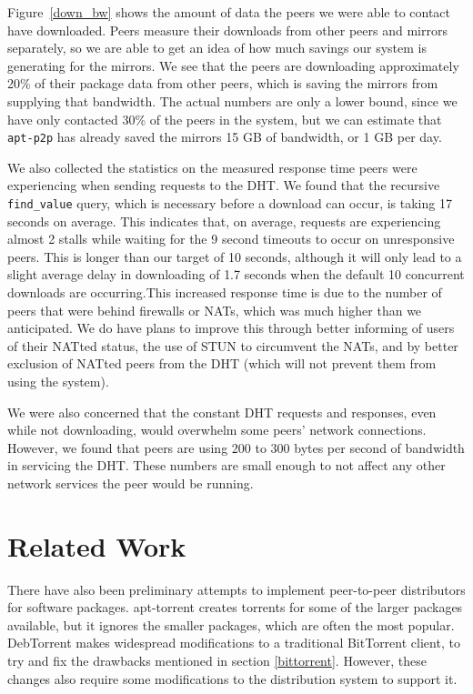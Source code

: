 \documentclass[conference]{IEEEtran}
\begin{document}
Figure~\ref{down_bw} shows the amount of data the peers we were able
to contact have downloaded. Peers measure their downloads from other
peers and mirrors separately, so we are able to get an idea of how
much savings our system is generating for the mirrors. We see that
the peers are downloading approximately 20\% of their package data
from other peers, which is saving the mirrors from supplying that
bandwidth. The actual numbers are only a lower bound, since we have
only contacted 30\% of the peers in the system, but we can estimate
that \texttt{apt-p2p} has already saved the mirrors 15 GB of
bandwidth, or 1 GB per day.

We also collected the statistics on the measured response time peers
were experiencing when sending requests to the DHT. We found that
the recursive \texttt{find\_value} query, which is necessary before
a download can occur, is taking 17 seconds on average. This
indicates that, on average, requests are experiencing almost 2
stalls while waiting for the 9 second timeouts to occur on
unresponsive peers. This is longer than our target of 10 seconds,
although it will only lead to a slight average delay in downloading
of 1.7 seconds when the default 10 concurrent downloads are
occurring.This increased response time is due to the number of peers
that were behind firewalls or NATs, which was much higher than we
anticipated. We do have plans to improve this through better
informing of users of their NATted status, the use of STUN
\cite{STUN} to circumvent the NATs, and by better exclusion of
NATted peers from the DHT (which will not prevent them from using
the system).

We were also concerned that the constant DHT requests and responses,
even while not downloading, would overwhelm some peers' network
connections. However, we found that peers are using 200 to 300 bytes
per second of bandwidth in servicing the DHT. These numbers are
small enough to not affect any other network services the peer would
be running.


\section{Related Work}
\label{others}

There have also been preliminary attempts to implement peer-to-peer distributors for
software packages. apt-torrent \cite{apttorrent} creates torrents
for some of the larger packages available, but it ignores the
smaller packages, which are often the most popular. DebTorrent
\cite{debtorrent} makes widespread modifications to a traditional
BitTorrent client, to try and fix the drawbacks mentioned in section
\ref{bittorrent}. However, these changes also require some
modifications to the distribution system to support it.
\end{document}

